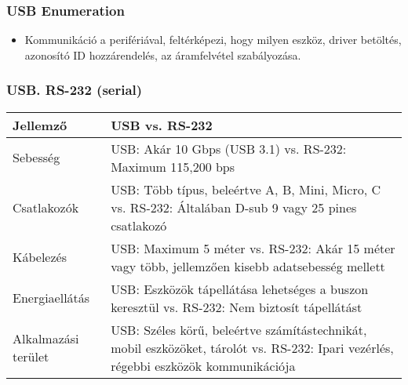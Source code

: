 \subsubsection{USB Enumeration}
\begin{itemize}
    \item Kommunikáció a perifériával, feltérképezi, hogy milyen eszköz, driver betöltés, azonosító ID hozzárendelés, az áramfelvétel szabályozása.
\end{itemize}

\subsubsection{USB. RS-232 (serial)}
\begin{table}[ht]
    \centering
    \begin{tabularx}{\textwidth}{X X}
    \toprule
    \textbf{Jellemző} & \textbf{USB vs. RS-232} \\
    \midrule
    Sebesség & USB: Akár 10 Gbps (USB 3.1) vs. RS-232: Maximum 115,200 bps \\
    \midrule
    Csatlakozók & USB: Több típus, beleértve A, B, Mini, Micro, C vs. RS-232: Általában D-sub 9 vagy 25 pines csatlakozó \\
    \midrule
    Kábelezés & USB: Maximum 5 méter vs. RS-232: Akár 15 méter vagy több, jellemzően kisebb adatsebesség mellett \\
    \midrule
    Energiaellátás & USB: Eszközök tápellátása lehetséges a buszon keresztül vs. RS-232: Nem biztosít tápellátást \\
    \midrule
    Alkalmazási terület & USB: Széles körű, beleértve számítástechnikát, mobil eszközöket, tárolót vs. RS-232: Ipari vezérlés, régebbi eszközök kommunikációja \\
    \bottomrule
    \end{tabularx}
    \label{table:usb_vs_rs232}
\end{table}

\clearpage
